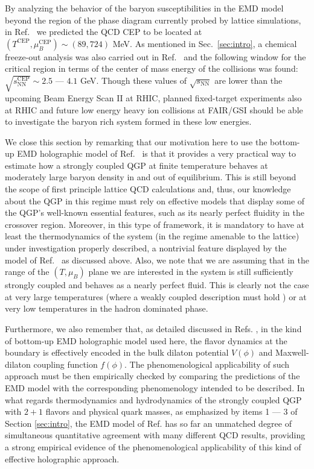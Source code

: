 \documentclass[aps,prd,showkeys,superscriptaddress,singlecolumn,nofootinbib,floatfix]{revtex4-1}
\begin{document}
By analyzing the behavior of the baryon susceptibilities in the EMD model beyond the region of the phase diagram currently probed by lattice simulations, in Ref.\ \cite{Critelli:2017oub} we predicted the QCD CEP to be located at $(T^{\textrm{CEP}},\mu_B^{\textrm{CEP}})\sim(89,724)$ MeV. As mentioned in Sec.\ \ref{sec:intro}, a chemical freeze-out analysis was also carried out in Ref.\ \cite{Critelli:2017oub} and the following window for the critical region in terms of the center of mass energy of the collisions was found: $\sqrt{s_{\textrm{NN}}^{\textrm{CEP}}}\sim 2.5$ --- $4.1$ GeV. Though these values of $\sqrt{s_{\textrm{NN}}}$ are lower than the upcoming Beam Energy Scan II at RHIC, planned fixed-target experiments also at RHIC \cite{Meehan:2017cum} and future low energy heavy ion collisions at FAIR/GSI \cite{Ablyazimov:2017guv} should be able to investigate the baryon rich system formed in these low energies.

We close this section by remarking that our motivation here to use the bottom-up EMD holographic model of Ref.\ \cite{Critelli:2017oub} is that it provides a very practical way to estimate how a strongly coupled QGP at finite temperature behaves at moderately large baryon density in and out of equilibrium. This is still beyond the scope of first principle lattice QCD calculations and, thus, our knowledge about the QGP in this regime must rely on effective models that display some of the QGP's well-known essential features, such as its nearly perfect fluidity in the crossover region. Moreover, in this type of framework, it is mandatory to have at least the thermodynamics of the system (in the regime amenable to the lattice) under investigation properly described, a nontrivial feature displayed by the model of Ref.\ \cite{Critelli:2017oub} as discussed above. Also, we note that we are assuming that in the range of the $(T,\mu_B)$ plane we are interested in the system is still sufficiently strongly coupled and behaves as a nearly perfect fluid. This is clearly not the case at very large temperatures (where a weakly coupled description must hold \cite{Haque:2014rua}) or at very low temperatures in the hadron dominated phase.

Furthermore, we also remember that, as detailed discussed in Refs. \cite{Gubser:2008ny,Gubser:2008yx,DeWolfe:2010he,DeWolfe:2011ts,Rougemont:2015wca,Critelli:2017oub}, in the kind of bottom-up EMD holographic model used here, the flavor dynamics at the boundary is effectively encoded in the bulk dilaton potential $V(\phi)$ and Maxwell-dilaton coupling function $f(\phi)$. The phenomenological applicability of such approach must be then empirically checked by comparing the predictions of the EMD model with the corresponding phenomenology intended to be described. In what regards thermodynamics and hydrodynamics of the strongly coupled QGP with $2+1$ flavors and physical quark masses, as emphasized by items 1 --- 3 of Section \ref{sec:intro}, the EMD model of Ref. \cite{Critelli:2017oub} has so far an unmatched degree of simultaneous quantitative agreement with many different QCD results, providing a strong empirical evidence of the phenomenological applicability of this kind of effective holographic approach.
\end{document}
